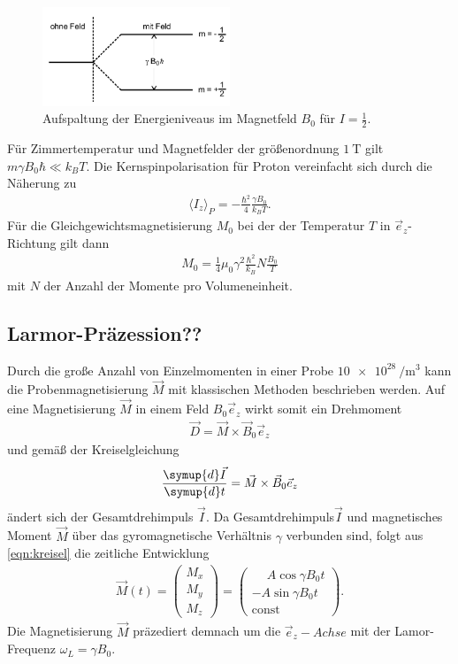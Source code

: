 \begin{figure}
 \centering
 \includegraphics[width=0.5\textwidth]{Zeeman.PNG}
 \caption{Aufspaltung der Energieniveaus im Magnetfeld $B_0$ für $I=\tfrac{1}{2}$.\cite{sample}}
 \label{fig:Proton}
\end{figure}
Für Zimmertemperatur und Magnetfelder
der größenordnung $\SI{1}{\tesla}$
gilt $m\gamma B_0 \hbar \ll k_BT$.
Die Kernspinpolarisation für Proton
vereinfacht sich
durch die Näherung zu
\begin{align}
\langle I_z\rangle_P= -\frac{\hbar^2}{4}\frac{\gamma B_0}{k_B T}.
\end{align}
Für die Gleichgewichtsmagnetisierung $M_0$ bei der
der Temperatur $T$ in $\vec{e}_z$-Richtung gilt dann
\begin{align}
M_0=\frac{1}{4}\mu_0 \gamma^2 \frac{\hbar^2}{k_B} N \frac{B_0}{T}
\end{align}
mit $N$ der Anzahl der Momente pro Volumeneinheit.

\subsection{Larmor-Präzession??}
\label{subsec:zielsetzung}
Durch die große Anzahl von Einzelmomenten in einer Probe \approx $\SI{10e28}{\per\cubic\meter}$
kann die Probenmagnetisierung $\vec{M}$ mit klassischen Methoden
beschrieben werden.
Auf eine Magnetisierung $\vec{M}$ in einem Feld $B_0\vec{e}_z$
wirkt somit ein Drehmoment
\begin{align}
\vec{D}=\vec{M} \times \vec{B}_0 \vec{e}_z
\end{align}
und gemäß der Kreiselgleichung
\begin{align}
  \frac{\symup{d}\vec{I}}{\symup{d}t}=\vec{M}\times\vec{B}_0 \vec{e}_z \label{eqn:kreisel}
\end{align}
 ändert sich der Gesamtdrehimpuls $\vec{I}$.
Da Gesamtdrehimpuls$\vec{I}$ und magnetisches Moment $\vec{M}$
über das gyromagnetische Verhältnis $\gamma$
verbunden sind, folgt aus \eqref{eqn:kreisel}
die zeitliche Entwicklung
\begin{align}
  \vec{M}(t)=
  \left( \begin{array}{c} M_x \\ M_y \\ M_z \end{array}\right)
=\left( \begin{array}{c} \phantom{-}A\cos\gamma B_0 t \\ -A\sin\gamma B_0 t \\ \text{const} \end{array}\right).
\end{align}
Die Magnetisierung $\vec{M}$ präzediert demnach um die
$\vec{e}_z-Achse$ mit der Lamor-Frequenz $\omega_L=\gamma B_0$.

